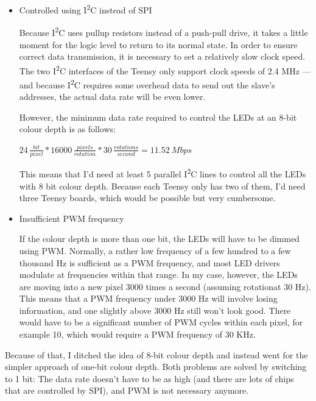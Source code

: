 \documentclass[a4paper, 11pt, titlepage]{report}
\def \iZc {I\textsuperscript{2}C\xspace}
\newenvironment{ownmath}
{\vspace{2mm}\hspace{15pt}\begin{math}}
{\end{math}\vspace{2mm}}
\begin{document}
\begin{itemize}

	\item Controlled using \iZc  instead of SPI

Because \iZc uses pullup resistors instead of a push-pull drive, it takes a little moment for the
logic level to return to its normal state. In order to ensure correct data transmission, it is 
necessary to set a relatively slow clock speed. The two \iZc interfaces of the Teensy only support
clock speeds of 2.4 MHz --- and because \iZc requires some overhead data to send out the slave's
addresses, the actual data rate will be even lower.

However, the minimum data rate required to control the LEDs at an 8-bit colour depth is as follows:

\begin{ownmath}
24\,\frac{\si{bit}}{\si{pixel}} * 16000\,\frac{\si{pixels}}{\si{rotation}} * 30\,\frac{\si{rotations}}{\si{second}} = \SI{11.52}{Mbps} 
\end{ownmath}

This means that I'd need at least 5 parallel \iZc lines to control all the LEDs with 8 bit colour
depth. Because each Teensy only has two of them, I'd need three Teensy boards, which would be
possible but very cumbersome.

	\item Insufficient PWM frequency

If the colour depth is more than one bit, the LEDs will have to be dimmed using PWM. Normally, a
rather low frequency of a few hundred to a few thousand Hz is sufficient as a PWM frequency, and
most LED drivers modulate at frequencies within that range. In my case, however, the LEDs are 
moving into a new pixel 3000 times a second (assuming rotationat 30 Hz). This means that a PWM
frequency under 3000 Hz will involve losing information, and one slightly above 3000 Hz still
won't look good. There would have to be a significant number of PWM cycles within each pixel,
for example 10, which would require a PWM frequency of 30 KHz.

\end{itemize}

Because of that, I ditched the idea of 8-bit colour depth and instead went for the simpler approach
of one-bit colour depth. Both problems are solved by switching to 1 bit: The data rate doesn't have
to be as high (and there are lots of chips that are controlled by SPI), and PWM is not necessary
anymore.
\end{document}
